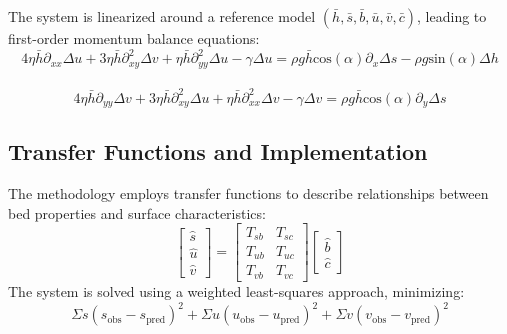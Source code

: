 The system is linearized around a reference model $(\bar{h}, \bar{s}, \bar{b}, \bar{u}, \bar{v}, \bar{c})$, leading to first-order momentum balance equations:
\begin{equation}
4 \eta \bar{h} \partial_{xx} \Delta u + 3 \eta \bar{h} \partial_{xy}^{2} \Delta v + \eta \bar{h} \partial_{yy}^{2}\Delta u -\gamma \Delta u  = \rho g \bar{h}\mathrm{cos}(\alpha) \partial_x \Delta s - \rho g \mathrm{sin}(\alpha)\Delta h
\end{equation}\\
\begin{equation}
4 \eta \bar{h} \partial_{yy} \Delta v + 3 \eta \bar{h} \partial_{xy}^{2} \Delta u + \eta \bar{h} \partial_{xx}^{2}\Delta v -\gamma \Delta v  = \rho g \bar{h}\mathrm{cos}(\alpha) \partial_y \Delta s
\end{equation}

\subsection*{Transfer Functions and Implementation}
The methodology employs transfer functions to describe relationships between bed properties and surface characteristics:
$$\begin{bmatrix}
\hat{s} \\
\hat{u} \\
\hat{v}
\end{bmatrix} =\begin{bmatrix}
T_{sb} & T_{sc} \\
T_{ub} & T_{uc} \\
T_{vb} & T_{vc}
\end{bmatrix}
\begin{bmatrix}
\hat{b}\\
\hat{c}
\end{bmatrix}$$
The system is solved using a weighted least-squares approach, minimizing:
\begin{equation}
\Sigma s(s_{\mathrm{obs}} - s_{\mathrm{pred}})^2 + \Sigma u(u_{\mathrm{obs}} - u_{\mathrm{pred}})^2 + \Sigma v(v_{\mathrm{obs}} - v_{\mathrm{pred}})^2
\end{equation}

